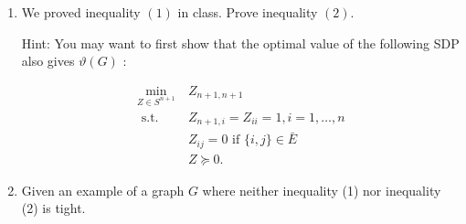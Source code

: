 \begin{enumerate}[leftmargin=*]
\item We proved inequality $(1)$ in class. Prove inequality $(2)$.

Hint: You may want to first show that the optimal value of the following SDP also gives \(\vartheta(G)\) :

\begin{equation}\tag{($D'$)}\label{d}
\begin{aligned}
\min _{Z \in S^{n+1}}&~ Z_{n+1, n+1} \\
\text { s.t. } &~Z_{n+1, i}=Z_{i i}=1, i=1, \ldots, n \\
&~Z_{i j}=0 \text { if }\{i, j\} \in \bar{E} \\
&~Z \succeq 0 .
\end{aligned}
\end{equation}
\item Given an example of a graph \(G\) where neither inequality (1) nor inequality (2) is tight.
\end{enumerate}


